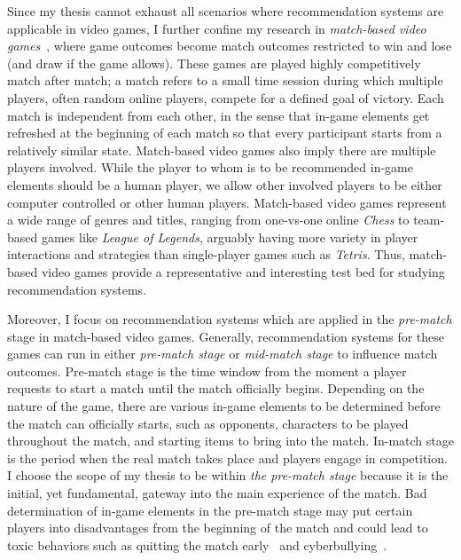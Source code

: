 Since my thesis cannot exhaust all scenarios where recommendation systems are applicable in video games, I further confine my research in \textit{match-based video games}~\cite{guo2012analysis}, where game outcomes become match outcomes restricted to win and lose (and draw if the game allows). These games are played highly competitively match after match; a match refers to a small time session during which multiple players, often random online players, compete for a defined goal of victory. Each match is independent from each other, in the sense that in-game elements get refreshed at the beginning of each match so that every participant starts from a relatively similar state. Match-based video games also imply there are multiple players involved. While the player to whom is to be recommended in-game elements should be a human player, we allow other involved players to be either computer controlled or other human players. Match-based video games represent a wide range of genres and titles, ranging from one-vs-one online \textit{Chess} to team-based games like \textit{League of Legends}, arguably having more variety in player interactions and strategies than single-player games such as \textit{Tetris}. Thus, match-based video games provide a representative and interesting test bed for studying recommendation systems.




Moreover, I focus on recommendation systems which are applied in the \textit{pre-match} stage in match-based video games. Generally, recommendation systems for these games can run in either \textit{pre-match stage} or \textit{mid-match stage} to influence match outcomes. Pre-match stage is the time window from the moment a player requests to start a match until the match officially begins. Depending on the nature of the game, there are various in-game elements to be determined before the match can officially starts, such as opponents, characters to be played throughout the match, and starting items to bring into the match. In-match stage is the period when the real match takes place and players engage in competition. I choose the scope of my thesis to be within \textit{the pre-match stage} because it is the initial, yet fundamental, gateway into the main experience of the match. Bad determination of in-game elements in the pre-match stage may put certain players into disadvantages from the beginning of the match and could lead to toxic behaviors such as quitting the match early~\cite{shores2014identification} and cyberbullying~\cite{kwak2015exploring}. 

